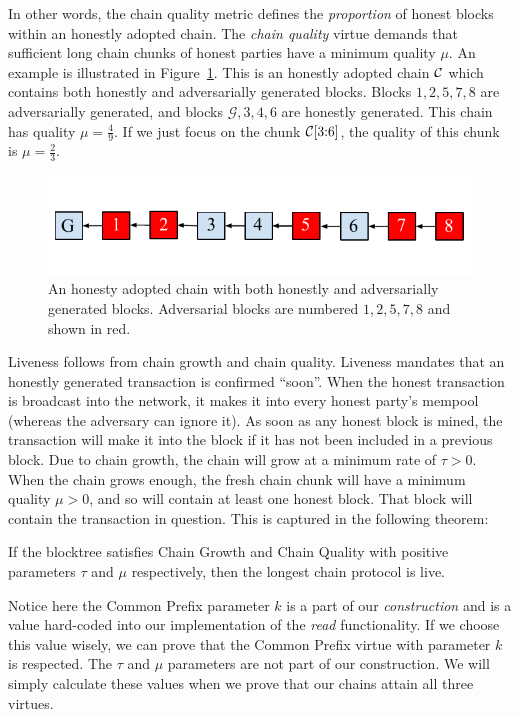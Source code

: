 In other words, the chain quality metric defines the \emph{proportion} of honest blocks
within an honestly adopted chain. The \emph{chain quality} virtue demands that
sufficient long chain chunks of honest parties have a minimum quality $\mu$. An example
is illustrated in Figure~\ref{fig.chain-quality}. This is an honestly adopted chain $\mathcal{C}$
which contains both honestly and adversarially generated blocks. Blocks $1, 2, 5, 7, 8$
are adversarially generated, and blocks $\mathcal{G}, 3, 4, 6$ are honestly generated.
This chain has quality $\mu = \frac{4}{9}$. If we just focus on the chunk $\mathcal{C}[3{:}6]$,
the quality of this chunk is $\mu = \frac{2}{3}$.

\begin{figure}[h]
    \centering
    \includegraphics[width=0.7 \columnwidth,keepaspectratio]{figures/chain-quality.pdf}
    \caption{An honesty adopted chain with both honestly and adversarially generated blocks.
             Adversarial blocks are numbered $1, 2, 5, 7, 8$ and shown in red.}
    \label{fig.chain-quality}
\end{figure}

Liveness follows from chain growth and chain quality.
Liveness mandates that an honestly generated transaction is confirmed ``soon''.
When the honest transaction is broadcast into the network, it makes it into every
honest party's mempool (whereas the adversary can ignore it). As soon as any honest
block is mined, the transaction will make it into the block if it has not been
included in a previous block. Due to chain growth, the chain will grow at a minimum
rate of $\tau > 0$. When the chain grows enough, the fresh chain chunk will have a minimum
quality $\mu > 0$, and so will contain at least one honest block. That block will
contain the transaction in question. This is captured in the following theorem:

\begin{theorem}
    If the blocktree satisfies Chain Growth and Chain Quality with positive parameters $\tau$
    and $\mu$ respectively, then the longest chain protocol is live.
\end{theorem}

Notice here the Common Prefix parameter $k$ is a part of our \emph{construction} and is a value
hard-coded into our implementation of the \emph{read} functionality. If we choose this value
wisely, we can prove that the Common Prefix virtue with parameter $k$ is respected. The $\tau$
and $\mu$ parameters are not part of our construction. We will simply calculate these values
when we prove that our chains attain all three virtues.

